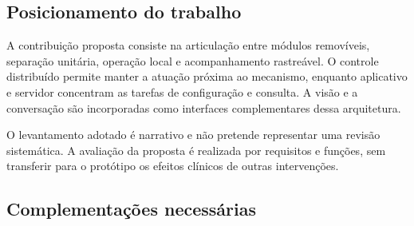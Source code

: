 \subsection{Posicionamento do trabalho}
A contribuição proposta consiste na articulação entre módulos removíveis, separação unitária, operação local e acompanhamento rastreável. O controle distribuído permite manter a atuação próxima ao mecanismo, enquanto aplicativo e servidor concentram as tarefas de configuração e consulta. A visão e a conversação são incorporadas como interfaces complementares dessa arquitetura.

O levantamento adotado é narrativo e não pretende representar uma revisão sistemática. A avaliação da proposta é realizada por requisitos e funções, sem transferir para o protótipo os efeitos clínicos de outras intervenções.

\subsection*{\textcolor{DCPendente}{Complementações necessárias}}
